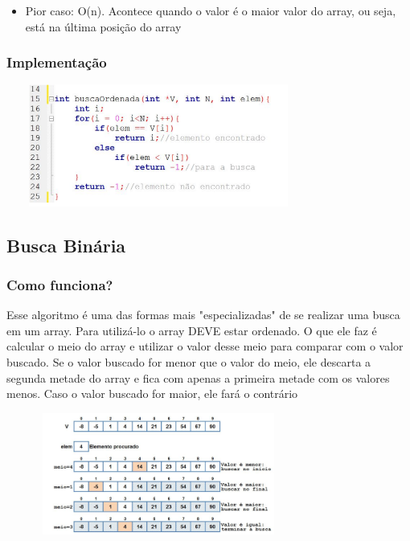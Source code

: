 \documentclass{report}
\begin{document}
	\begin{itemize}
		\item Pior caso: O(n). Acontece quando o valor é o maior valor do array, ou seja, está na última posição do array
	\end{itemize}
	
	\subsubsection{Implementação}
	
	\begin{center}
		
		\includegraphics[width=10cm,height=4cm,keepaspectratio=false]{imagens/blinearordenadafuncionamento.png}
		
	\end{center}
	
	\subsection{Busca Binária}
	
	\subsubsection{Como funciona?}
	
	Esse algoritmo é uma das formas mais "especializadas" de se realizar uma busca em um array. Para utilizá-lo o array DEVE estar ordenado. O que ele faz é calcular o meio do array e utilizar o valor desse meio para comparar com o valor buscado. Se o valor buscado for menor que o valor do meio, ele descarta a segunda metade do array e fica com apenas a primeira metade com os valores menos. Caso o valor buscado for maior, ele fará o contrário
	
	\begin{center}
		
		\includegraphics[width=10cm,height=4cm,keepaspectratio=false]{imagens/bbinaria.png}
		
	\end{center}
	
\end{document}
